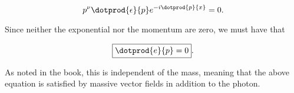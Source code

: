 \begin{parts}
\begin{equation*}
    p^{\nu} \dotprod{\epsilon}{p}e^{-i\dotprod{p}{x}} = 0.
\end{equation*}

Since neither the exponential nor the momentum are zero, we must have that

\begin{equation*}
    \boxed{\dotprod{e}{p} = 0}.
\end{equation*}

As noted in the book, this is independent of the mass, meaning that the above equation is satisfied by massive vector fields in addition to the photon.









\end{parts}
